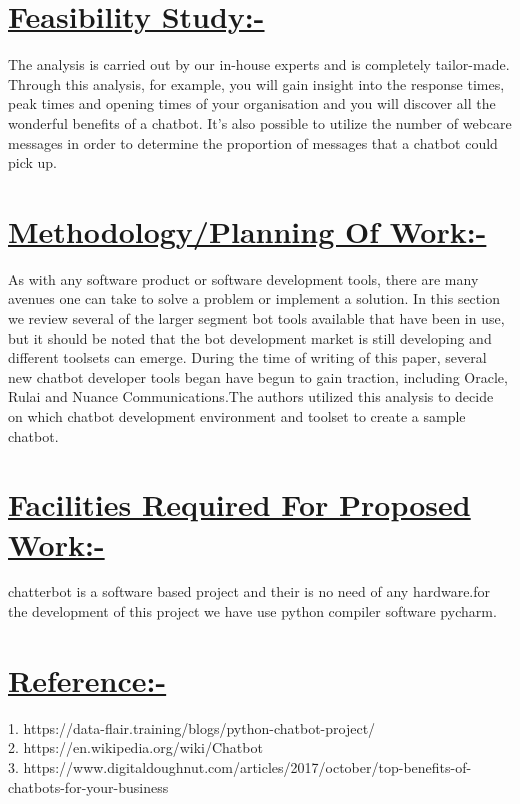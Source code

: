 \documentclass[a4,18pt]{article}
\begin{document}
\section{\underline{Feasibility Study:-}}The analysis is carried out by our in-house experts and is completely tailor-made. Through this analysis, for example, you will gain insight into the response times, peak times and opening times of your organisation and you will discover all the wonderful benefits of a chatbot. It’s also possible to utilize the number of webcare messages in order to determine the proportion of messages that a chatbot could pick up.
\section{\underline{Methodology/Planning Of Work:-}}As with any software product or software development tools, there are many avenues one can take to solve a problem or implement a solution. In this section we review several of the larger segment bot tools available that have been in use, but it should be noted that the bot development market is still developing and different toolsets can emerge. During the time of writing of this paper, several new chatbot developer tools began have begun to gain traction, including Oracle, Rulai and Nuance Communications.The authors utilized this analysis to decide on which chatbot development environment and toolset to create a sample chatbot.
\section{\underline{Facilities Required For Proposed Work:-}}chatterbot is a software based project and their is no need of any hardware.for the development of this project we have use python compiler software pycharm.
\section{\underline{Reference:-}}1. https://data-flair.training/blogs/python-chatbot-project/ \\
  2. https://en.wikipedia.org/wiki/Chatbot \\ 3. https://www.digitaldoughnut.com/articles/2017/october/top-benefits-of-chatbots-for-your-business
\end{document}
